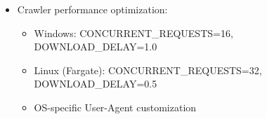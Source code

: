 \begin{itemize}
  \begin{quote}
  Overall metrics are modest (below 0.5) because the RAG prompt is
  configured to provide detailed, comprehensive answers \(\rightarrow\)
  reduces cosine similarity when Ragas reverse-translates to questions.
  \end{quote}
\item
  Crawler performance optimization:

  \begin{itemize}
  \tightlist
  \item
    Windows: CONCURRENT\_REQUESTS=16, DOWNLOAD\_DELAY=1.0
  \item
    Linux (Fargate): CONCURRENT\_REQUESTS=32, DOWNLOAD\_DELAY=0.5
  \item
    OS-specific User-Agent customization
  \end{itemize}
\end{itemize}
